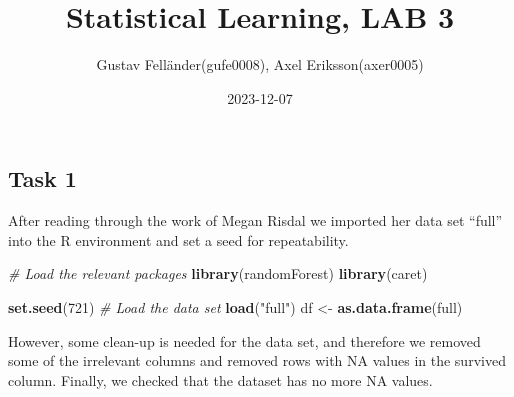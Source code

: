 \documentclass[
]{article}
\title{Statistical Learning, LAB 3}
\author{Gustav Felländer(gufe0008), Axel Eriksson(axer0005)}
\date{2023-12-07}
\newenvironment{Shaded}{\begin{snugshade}}{\end{snugshade}}
\newcommand{\CommentTok}[1]{\textcolor[rgb]{0.56,0.35,0.01}{\textit{#1}}}
\newcommand{\DecValTok}[1]{\textcolor[rgb]{0.00,0.00,0.81}{#1}}
\newcommand{\FunctionTok}[1]{\textcolor[rgb]{0.13,0.29,0.53}{\textbf{#1}}}
\newcommand{\NormalTok}[1]{#1}
\newcommand{\OtherTok}[1]{\textcolor[rgb]{0.56,0.35,0.01}{#1}}
\newcommand{\SpecialCharTok}[1]{\textcolor[rgb]{0.81,0.36,0.00}{\textbf{#1}}}
\newcommand{\StringTok}[1]{\textcolor[rgb]{0.31,0.60,0.02}{#1}}
\begin{document}
\maketitle

\hypertarget{task-1}{%
\subsection{Task 1}\label{task-1}}

After reading through the work of Megan Risdal we imported her data set
``full'' into the R environment and set a seed for repeatability.

\begin{Shaded}
\begin{Highlighting}[]
\CommentTok{\# Load the relevant packages}
\FunctionTok{library}\NormalTok{(randomForest)}
\FunctionTok{library}\NormalTok{(caret)}

\FunctionTok{set.seed}\NormalTok{(}\DecValTok{721}\NormalTok{)}
\CommentTok{\# Load the data set}
\FunctionTok{load}\NormalTok{(}\StringTok{"full"}\NormalTok{)}
\NormalTok{df }\OtherTok{\textless{}{-}} \FunctionTok{as.data.frame}\NormalTok{(full)}
\end{Highlighting}
\end{Shaded}

However, some clean-up is needed for the data set, and therefore we
removed some of the irrelevant columns and removed rows with NA values
in the survived column. Finally, we checked that the dataset has no more
NA values.

\begin{Shaded}
\end{Shaded}
\end{document}
